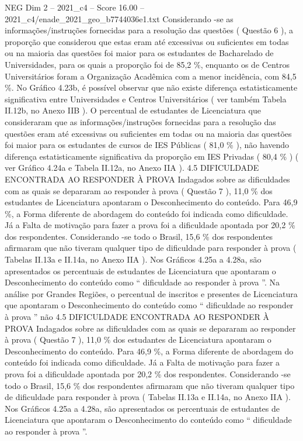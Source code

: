 \begin{textsample}{NEG Dim 2 – 2021\_c4 – Score 16.00 – 2021\_c4/enade\_2021\_geo\_b7744036e1.txt}
Considerando -se as informações/instruções fornecidas para a resolução das questões ( Questão 6 ), a proporção que considerou que estas eram até excessivas ou suficientes em todas ou na maioria das questões foi maior para os estudantes de Bacharelado de Universidades, para os quais a proporção foi de 85,2 \%, enquanto os de Centros Universitários foram a Organização Acadêmica com a menor incidência, com 84,5 \%.
No Gráfico 4.23b, é possível observar que não existe diferença estatisticamente significativa entre Universidades e Centros Universitários ( ver também Tabela II.12b, no Anexo IIB ).
O percentual de estudantes de Licenciatura que consideraram que as informações/instruções fornecidas para a resolução das questões eram até excessivas ou suficientes em todas ou na maioria das questões foi maior para os estudantes de cursos de IES Públicas ( 81,0 \% ), não havendo diferença estatisticamente significativa da proporção em IES Privadas ( 80,4 \% ) ( ver Gráfico 4.24a e Tabela II.12a, no Anexo IIA ). 4.5 DIFICULDADE ENCONTRADA AO RESPONDER À PROVA Indagados sobre as dificuldades com as quais se depararam ao responder à prova ( Questão 7 ), 11,0 \% dos estudantes de Licenciatura apontaram o Desconhecimento do conteúdo.
Para 46,9 \%, a Forma diferente de abordagem do conteúdo foi indicada como dificuldade.
Já a Falta de motivação para fazer a prova foi a dificuldade apontada por 20,2 \% dos respondentes.
Considerando -se todo o Brasil, 15,6 \% dos respondentes afirmaram que não tiveram qualquer tipo de dificuldade para responder à prova ( Tabelas II.13a e II.14a, no Anexo IIA ).
Nos Gráficos 4.25a a 4.28a, são apresentados os percentuais de estudantes de Licenciatura que apontaram o Desconhecimento do conteúdo como “ dificuldade ao responder à prova ”.
Na análise por Grandes Regiões, o percentual de inscritos e presentes de Licenciatura que apontaram o Desconhecimento do conteúdo como “ dificuldade ao responder à prova ” não 4.5 DIFICULDADE ENCONTRADA AO RESPONDER À PROVA Indagados sobre as dificuldades com as quais se depararam ao responder à prova ( Questão 7 ), 11,0 \% dos estudantes de Licenciatura apontaram o Desconhecimento do conteúdo.
Para 46,9 \%, a Forma diferente de abordagem do conteúdo foi indicada como dificuldade.
Já a Falta de motivação para fazer a prova foi a dificuldade apontada por 20,2 \% dos respondentes.
Considerando -se todo o Brasil, 15,6 \% dos respondentes afirmaram que não tiveram qualquer tipo de dificuldade para responder à prova ( Tabelas II.13a e II.14a, no Anexo IIA ).
Nos Gráficos 4.25a a 4.28a, são apresentados os percentuais de estudantes de Licenciatura que apontaram o Desconhecimento do conteúdo como “ dificuldade ao responder à prova ”.

\end{textsample}
